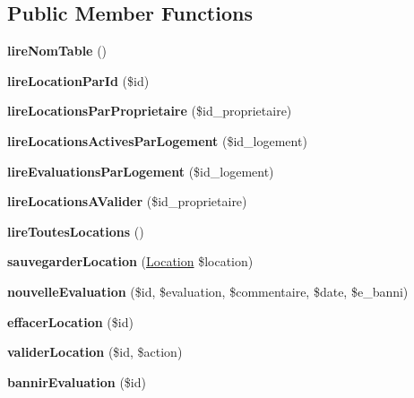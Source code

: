 \subsection*{Public Member Functions}
\begin{DoxyCompactItemize}
\item 
\mbox{\label{class_modele_location_a6f0a67f8a3315102c7b951fc9eecb9f4}} 
{\bfseries lire\+Nom\+Table} ()
\item 
\mbox{\label{class_modele_location_ac72b3969f2b1e17e6f52265d27716925}} 
{\bfseries lire\+Location\+Par\+Id} (\$id)
\item 
\mbox{\label{class_modele_location_ae839be48113494d78b8bee582a5b86a4}} 
{\bfseries lire\+Locations\+Par\+Proprietaire} (\$id\+\_\+proprietaire)
\item 
\mbox{\label{class_modele_location_a40644abd573361c1f90ab620553cb6d0}} 
{\bfseries lire\+Locations\+Actives\+Par\+Logement} (\$id\+\_\+logement)
\item 
\mbox{\label{class_modele_location_a06c7793eb038fb8debba49d5361e723f}} 
{\bfseries lire\+Evaluations\+Par\+Logement} (\$id\+\_\+logement)
\item 
\mbox{\label{class_modele_location_a5dc640bee151331eb27a2907c0d17523}} 
{\bfseries lire\+Locations\+A\+Valider} (\$id\+\_\+proprietaire)
\item 
\mbox{\label{class_modele_location_ad48146acdfbd8bf957688b920239af41}} 
{\bfseries lire\+Toutes\+Locations} ()
\item 
\mbox{\label{class_modele_location_a91c2c12b3ceaa2665d7ec78da6307db2}} 
{\bfseries sauvegarder\+Location} (\hyperlink{class_location}{Location} \$location)
\item 
\mbox{\label{class_modele_location_a8343a224c2128287618c34bf34551d2a}} 
{\bfseries nouvelle\+Evaluation} (\$id, \$evaluation, \$commentaire, \$date, \$e\+\_\+banni)
\item 
\mbox{\label{class_modele_location_a5b21f75347074e3399ee5473302e3156}} 
{\bfseries effacer\+Location} (\$id)
\item 
\mbox{\label{class_modele_location_a1695439181223563ee48b8ea9b78a191}} 
{\bfseries valider\+Location} (\$id, \$action)
\item 
\mbox{\label{class_modele_location_a17b4b4f0370eca785f86523a10860460}} 
{\bfseries bannir\+Evaluation} (\$id)
\end{DoxyCompactItemize}
